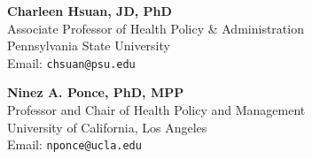 \documentclass[letterpaper,11pt]{article}
\begin{document}
\vspace{1.5em} %

\begin{minipage}[t]{0.48\textwidth}
    \textbf{Charleen Hsuan, JD, PhD} \\
    Associate Professor of Health Policy \& Administration \\
    Pennsylvania State University \\
    \small{Email: \texttt{chsuan@psu.edu}}
\end{minipage}
\hfill
\begin{minipage}[t]{0.48\textwidth}
    \textbf{Ninez A. Ponce, PhD, MPP} \\
    Professor and Chair of Health Policy and Management \\
    University of California, Los Angeles \\
    \small{Email: \texttt{nponce@ucla.edu}}
\end{minipage}

\vfill
{}
\end{document}
